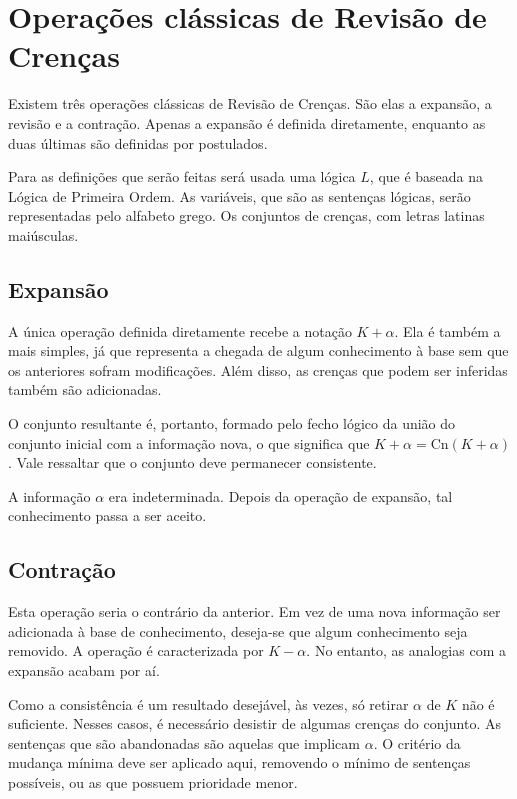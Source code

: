
\section{Operações clássicas de Revisão de Crenças}

Existem três operações clássicas de Revisão de Crenças. São elas a expansão, a revisão e a contração. Apenas a expansão é definida diretamente, enquanto as duas últimas são definidas por postulados. 

Para as definições que serão feitas será usada uma lógica $ L $, que é baseada na Lógica de Primeira Ordem. As variáveis, que são as sentenças lógicas, serão representadas pelo alfabeto grego. Os conjuntos de crenças, com letras latinas maiúsculas.

\subsection{Expansão}

A única operação definida diretamente recebe a notação $ K + \alpha $. Ela é também a mais simples, já que representa a chegada de algum conhecimento à base sem que os anteriores sofram modificações. Além disso, as crenças que podem ser inferidas também são adicionadas.

O conjunto resultante é, portanto, formado pelo fecho lógico da união do conjunto inicial com a informação nova, o que significa que $ K + \alpha = \text{Cn}(K + \alpha) $. Vale ressaltar que o conjunto deve permanecer consistente.

A informação $ \alpha $ era indeterminada. Depois da operação de expansão, tal conhecimento passa a ser aceito.

\subsection{Contração}

Esta operação seria o contrário da anterior. Em vez de uma nova informação ser adicionada à base de conhecimento, deseja-se que algum conhecimento seja removido. A operação é caracterizada por $ K - \alpha $. No entanto, as analogias com a expansão acabam por aí.

Como a consistência é um resultado desejável, às vezes, só retirar $ \alpha $ de $ K $ não é suficiente. Nesses casos, é necessário desistir de algumas crenças do conjunto. As sentenças que são abandonadas são aquelas que implicam $ \alpha $. O critério da mudança mínima deve ser aplicado aqui, removendo o mínimo de sentenças possíveis, ou as que possuem prioridade menor.


